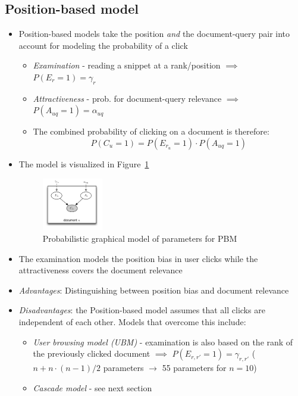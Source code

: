 \subsection{Position-based model}
\begin{itemize}
	\item Position-based models take the position \textit{and} the document-query pair into account for modeling the probability of a click
	\begin{itemize}
		\item \textit{Examination} - reading a snippet at a rank/position $\implies$ $P(E_r = 1) = \gamma_r$
		\item \textit{Attractiveness} - prob. for document-query relevance $\implies$ $P(A_{uq} = 1) = \alpha_{uq}$
		\item The combined probability of clicking on a document is therefore: $$P(C_u = 1) = P(E_{r_u} = 1) \cdot P(A_{uq} = 1)$$
	\end{itemize}
	\item The model is visualized in Figure~\ref{img:click_models_PBM_pgm}
	\begin{figure}[ht]
		\centering
		\includegraphics[width=0.25\textwidth]{figures/click_models_PBM_pgm.png}
		\caption{Probabilistic graphical model of parameters for PBM}
		\label{img:click_models_PBM_pgm}
	\end{figure}
	\item The examination models the position bias in user clicks while the attractiveness covers the document relevance
	\item \textit{Advantages}: Distinguishing between position bias and document relevance
	\item \textit{Disadvantages}: the Position-based model assumes that all clicks are independent of each other. Models that overcome this include:
	\begin{itemize}
		\item \textit{User browsing model (UBM)} - examination is also based on the rank of the previously clicked document $\implies$ $P(E_{r,r'}=1) = \gamma_{r,r'} $ ($n + n\cdot (n-1)/2$ parameters $\to$ 55 parameters for $n=10$)
		\item \textit{Cascade model} - see next section
	\end{itemize}
\end{itemize}
